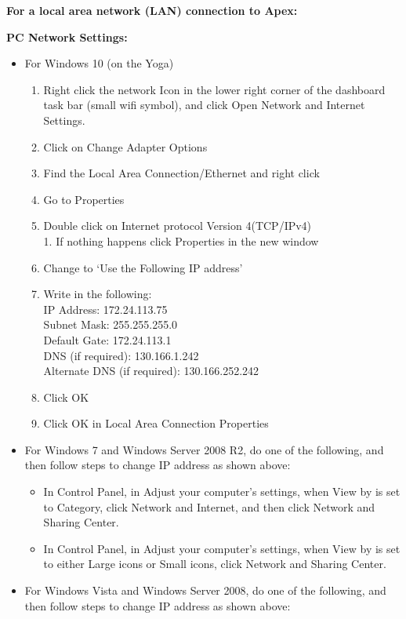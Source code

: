 \documentclass[
]{book}
\providecommand{\tightlist}{%
  \setlength{\itemsep}{0pt}\setlength{\parskip}{0pt}}
\begin{document}
\textbf{For a local area network (LAN) connection to Apex:}

\textbf{PC Network Settings:}

\begin{itemize}
\tightlist
\item
  For Windows 10 (on the Yoga)

  \begin{enumerate}
  \def\labelenumi{\arabic{enumi}.}
  \tightlist
  \item
    Right click the network Icon in the lower right corner of the dashboard task bar (small wifi symbol), and click Open Network and Internet Settings.\\
  \item
    Click on Change Adapter Options\\
  \item
    Find the Local Area Connection/Ethernet and right click\\
  \item
    Go to Properties\\
  \item
    Double click on Internet protocol Version 4(TCP/IPv4)\\
    1. If nothing happens click Properties in the new window\\
  \item
    Change to `Use the Following IP address'\\
  \item
    Write in the following:\\
    IP Address: 172.24.113.75\\
    Subnet Mask: 255.255.255.0\\
    Default Gate: 172.24.113.1\\
    DNS (if required): 130.166.1.242\\
    Alternate DNS (if required): 130.166.252.242\\
  \item
    Click OK\\
  \item
    Click OK in Local Area Connection Properties
  \end{enumerate}
\item
  For Windows 7 and Windows Server 2008 R2, do one of the following, and then follow steps to change IP address as shown above:

  \begin{itemize}
  \tightlist
  \item
    In Control Panel, in Adjust your computer's settings, when View by is set to Category, click Network and Internet, and then click Network and Sharing Center.\\
  \item
    In Control Panel, in Adjust your computer's settings, when View by is set to either Large icons or Small icons, click Network and Sharing Center.
  \end{itemize}
\item
  For Windows Vista and Windows Server 2008, do one of the following, and then follow steps to change IP address as shown above:


\end{itemize}
\end{document}
